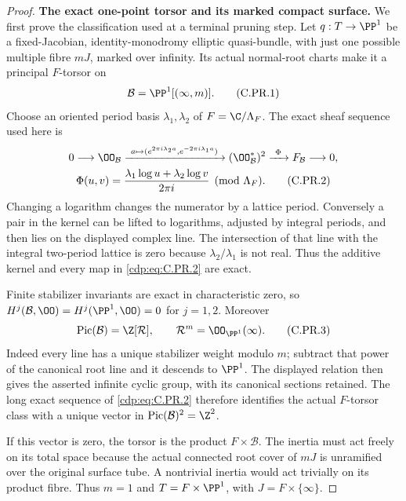 \begin{proof}
\par\medskip\noindent\textbf{The exact one-point torsor and its marked compact surface.}
We first prove the classification used at a terminal pruning step.
Let $q:T\to\PP^1$ be a fixed-Jacobian, identity-monodromy elliptic
quasi-bundle, with just one possible multiple fibre $mJ$, marked
over infinity. Its actual normal-root charts make it a principal
$F$-torsor on
\[
                 \mathcal B=\PP^1[(\infty,m)].          \tag{C.PR.1}\label{cdp:eq:C.PR.1}
\]
Choose an oriented period basis $\lambda_1,\lambda_2$ of
$F=\C/\Lambda_F$. The exact sheaf sequence used here is
\[
 \begin{gathered}
 0\longrightarrow\OO_{\mathcal B}
 \xrightarrow{\ a\mapsto
 (e^{2\pi i\lambda_2a},e^{-2\pi i\lambda_1a})\ }
 (\OO_{\mathcal B}^{*})^2
 \xrightarrow{\ \Phi\ }F_{\mathcal B}\longrightarrow0,\\
 \Phi(u,v)=
 \frac{\lambda_1\log u+\lambda_2\log v}{2\pi i}
                          \pmod{\Lambda_F}.            \tag{C.PR.2}\label{cdp:eq:C.PR.2}
 \end{gathered}
\]
Changing a logarithm changes the numerator by a lattice period.
Conversely a pair in the kernel can be lifted to logarithms,
adjusted by integral periods, and then lies on the displayed
complex line. The intersection of that line with the integral
two-period lattice is zero because
$\lambda_2/\lambda_1$ is not real. Thus the additive kernel and
every map in \eqref{cdp:eq:C.PR.2} are exact.

Finite stabilizer invariants are exact in characteristic zero, so
$H^j(\mathcal B,\OO)=H^j(\PP^1,\OO)=0$ for $j=1,2$.
Moreover
\[
 \operatorname{Pic}(\mathcal B)=\Z[\mathcal R],
                 \qquad \mathcal R^m=\OO_{\PP^1}(\infty).
                                                        \tag{C.PR.3}\label{cdp:eq:C.PR.3}
\]
Indeed every line has a unique stabilizer weight modulo $m$;
subtract that power of the canonical root line and it descends
to $\PP^1$. The displayed relation then gives the asserted
infinite cyclic group, with its canonical sections retained.
The long exact sequence of \eqref{cdp:eq:C.PR.2} therefore identifies the
actual $F$-torsor class with a unique vector in
$\operatorname{Pic}(\mathcal B)^2=\Z^2$.

If this vector is zero, the torsor is the product
$F\times\mathcal B$. The inertia must act freely on its total
space because the actual connected root cover of $mJ$ is
unramified over the original surface tube. A nontrivial inertia
would act trivially on its product fibre. Thus $m=1$ and
$T=F\times\PP^1$, with $J=F\times\{\infty\}$.


\end{proof}
